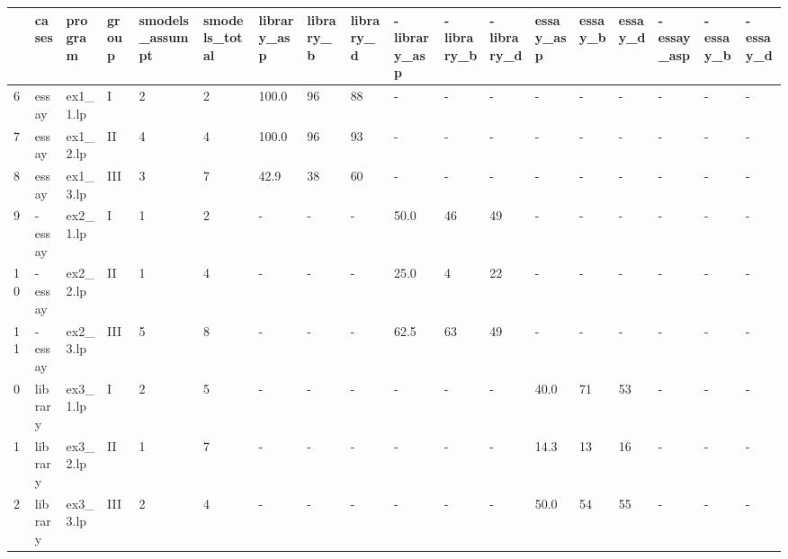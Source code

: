 \begin{tabular}{llllllllllllllllll}
\toprule
{} &     cases &   program & group & smodels\_assumpt & smodels\_total & library\_asp & library\_b & library\_d & -library\_asp & -library\_b & -library\_d & essay\_asp & essay\_b & essay\_d & -essay\_asp & -essay\_b & -essay\_d \\
\midrule
6  &     essay &  ex1\_1.lp &     I &               2 &             2 &       100.0 &        96 &        88 &            - &          - &          - &         - &       - &       - &          - &        - &        - \\
7  &     essay &  ex1\_2.lp &    II &               4 &             4 &       100.0 &        96 &        93 &            - &          - &          - &         - &       - &       - &          - &        - &        - \\
8  &     essay &  ex1\_3.lp &   III &               3 &             7 &        42.9 &        38 &        60 &            - &          - &          - &         - &       - &       - &          - &        - &        - \\
9  &    -essay &  ex2\_1.lp &     I &               1 &             2 &           - &         - &         - &         50.0 &         46 &         49 &         - &       - &       - &          - &        - &        - \\
10 &    -essay &  ex2\_2.lp &    II &               1 &             4 &           - &         - &         - &         25.0 &          4 &         22 &         - &       - &       - &          - &        - &        - \\
11 &    -essay &  ex2\_3.lp &   III &               5 &             8 &           - &         - &         - &         62.5 &         63 &         49 &         - &       - &       - &          - &        - &        - \\
0  &   library &  ex3\_1.lp &     I &               2 &             5 &           - &         - &         - &            - &          - &          - &      40.0 &      71 &      53 &          - &        - &        - \\
1  &   library &  ex3\_2.lp &    II &               1 &             7 &           - &         - &         - &            - &          - &          - &      14.3 &      13 &      16 &          - &        - &        - \\
2  &   library &  ex3\_3.lp &   III &               2 &             4 &           - &         - &         - &            - &          - &          - &      50.0 &      54 &      55 &          - &        - &        - \\

\end{tabular}
